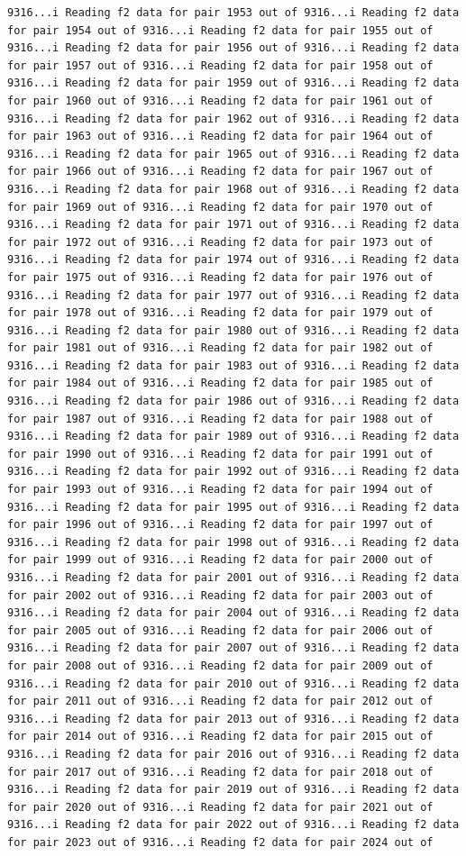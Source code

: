 \documentclass[
]{article}
\begin{document}
\begin{verbatim}
9316...i Reading f2 data for pair 1953 out of 9316...i Reading f2 data for pair 1954 out of 9316...i Reading f2 data for pair 1955 out of 9316...i Reading f2 data for pair 1956 out of 9316...i Reading f2 data for pair 1957 out of 9316...i Reading f2 data for pair 1958 out of 9316...i Reading f2 data for pair 1959 out of 9316...i Reading f2 data for pair 1960 out of 9316...i Reading f2 data for pair 1961 out of 9316...i Reading f2 data for pair 1962 out of 9316...i Reading f2 data for pair 1963 out of 9316...i Reading f2 data for pair 1964 out of 9316...i Reading f2 data for pair 1965 out of 9316...i Reading f2 data for pair 1966 out of 9316...i Reading f2 data for pair 1967 out of 9316...i Reading f2 data for pair 1968 out of 9316...i Reading f2 data for pair 1969 out of 9316...i Reading f2 data for pair 1970 out of 9316...i Reading f2 data for pair 1971 out of 9316...i Reading f2 data for pair 1972 out of 9316...i Reading f2 data for pair 1973 out of 9316...i Reading f2 data for pair 1974 out of 9316...i Reading f2 data for pair 1975 out of 9316...i Reading f2 data for pair 1976 out of 9316...i Reading f2 data for pair 1977 out of 9316...i Reading f2 data for pair 1978 out of 9316...i Reading f2 data for pair 1979 out of 9316...i Reading f2 data for pair 1980 out of 9316...i Reading f2 data for pair 1981 out of 9316...i Reading f2 data for pair 1982 out of 9316...i Reading f2 data for pair 1983 out of 9316...i Reading f2 data for pair 1984 out of 9316...i Reading f2 data for pair 1985 out of 9316...i Reading f2 data for pair 1986 out of 9316...i Reading f2 data for pair 1987 out of 9316...i Reading f2 data for pair 1988 out of 9316...i Reading f2 data for pair 1989 out of 9316...i Reading f2 data for pair 1990 out of 9316...i Reading f2 data for pair 1991 out of 9316...i Reading f2 data for pair 1992 out of 9316...i Reading f2 data for pair 1993 out of 9316...i Reading f2 data for pair 1994 out of 9316...i Reading f2 data for pair 1995 out of 9316...i Reading f2 data for pair 1996 out of 9316...i Reading f2 data for pair 1997 out of 9316...i Reading f2 data for pair 1998 out of 9316...i Reading f2 data for pair 1999 out of 9316...i Reading f2 data for pair 2000 out of 9316...i Reading f2 data for pair 2001 out of 9316...i Reading f2 data for pair 2002 out of 9316...i Reading f2 data for pair 2003 out of 9316...i Reading f2 data for pair 2004 out of 9316...i Reading f2 data for pair 2005 out of 9316...i Reading f2 data for pair 2006 out of 9316...i Reading f2 data for pair 2007 out of 9316...i Reading f2 data for pair 2008 out of 9316...i Reading f2 data for pair 2009 out of 9316...i Reading f2 data for pair 2010 out of 9316...i Reading f2 data for pair 2011 out of 9316...i Reading f2 data for pair 2012 out of 9316...i Reading f2 data for pair 2013 out of 9316...i Reading f2 data for pair 2014 out of 9316...i Reading f2 data for pair 2015 out of 9316...i Reading f2 data for pair 2016 out of 9316...i Reading f2 data for pair 2017 out of 9316...i Reading f2 data for pair 2018 out of 9316...i Reading f2 data for pair 2019 out of 9316...i Reading f2 data for pair 2020 out of 9316...i Reading f2 data for pair 2021 out of 9316...i Reading f2 data for pair 2022 out of 9316...i Reading f2 data for pair 2023 out of 9316...i Reading f2 data for pair 2024 out of 
\end{verbatim}
\end{document}
